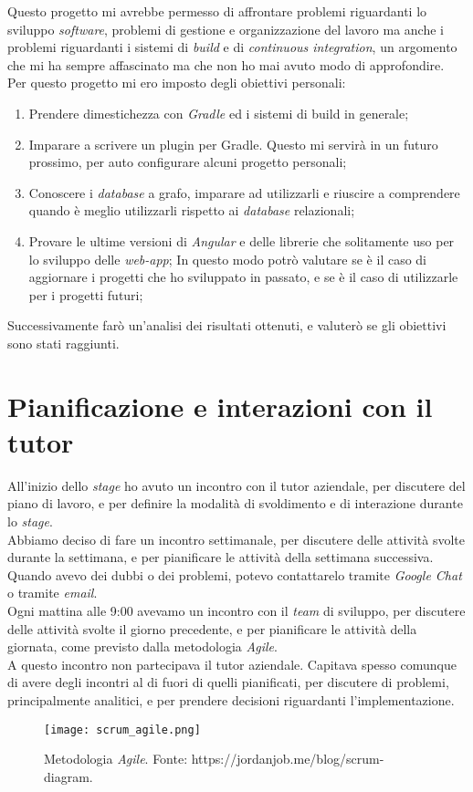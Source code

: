 Questo progetto mi avrebbe permesso di affrontare problemi riguardanti lo sviluppo \textit{software}, problemi di gestione e organizzazione del lavoro ma 
anche i problemi riguardanti i sistemi di \textit{build} e di \textit{continuous integration}, un argomento che mi ha sempre affascinato ma che non ho mai
avuto modo di approfondire.\\
Per questo progetto mi ero imposto degli obiettivi personali:
\begin{enumerate}
  \item Prendere dimestichezza con \textit{Gradle} ed i sistemi di build in generale;
  \item Imparare a scrivere un plugin per Gradle. Questo mi servirà in un futuro prossimo, per auto configurare alcuni progetto personali;
  \item Conoscere i \textit{database} a grafo, imparare ad utilizzarli e riuscire a comprendere quando è meglio utilizzarli rispetto ai \textit{database} relazionali;
  \item Provare le ultime versioni di \textit{Angular} e delle librerie che solitamente uso per lo sviluppo delle \textit{web-app}; 
      In questo modo potrò valutare se è il caso di aggiornare i progetti che ho sviluppato in passato, e se è il caso di utilizzarle per i progetti futuri;
\end{enumerate}
Successivamente farò un'analisi dei risultati ottenuti, e valuterò se gli obiettivi sono stati raggiunti.\\

\section{Pianificazione e interazioni con il tutor}
All'inizio dello \textit{stage} ho avuto un incontro con il tutor aziendale, per discutere del piano di lavoro, e per definire la modalità
di svoldimento e di interazione durante lo \textit{stage}.\\
Abbiamo deciso di fare un incontro settimanale, per discutere delle attività svolte durante la settimana, e per pianificare le attività
della settimana successiva.\\
Quando avevo dei dubbi o dei problemi, potevo contattarelo tramite \textit{Google Chat} o tramite \textit{email}.\\
Ogni mattina alle 9:00 avevamo un incontro con il \textit{team} di sviluppo, per discutere delle attività svolte il giorno precedente, e per
pianificare le attività della giornata, come previsto dalla metodologia \textit{Agile}.\\
A questo incontro non partecipava il tutor aziendale. 
Capitava spesso comunque di avere degli incontri al di fuori di quelli pianificati, per discutere di problemi, principalmente analitici, 
e per prendere decisioni riguardanti l'implementazione.\\

\begin{figure}[h] 
  \centering 
  \texttt{[image: scrum\_agile.png]} 
  \caption{Metodologia \textit{Agile}. Fonte: https://jordanjob.me/blog/scrum-diagram. }
  \label{fig:scrum_agile}
\end{figure}
